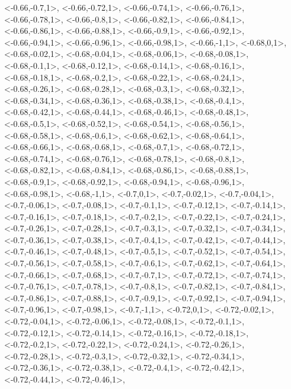 \documentclass[a4paper,10pt]{article}
\begin{document}
\begin{eulernotebook}
\begin{euleroutput}
  <-0.66,-0.7,1>,
  <-0.66,-0.72,1>,
  <-0.66,-0.74,1>,
  <-0.66,-0.76,1>,
  <-0.66,-0.78,1>,
  <-0.66,-0.8,1>,
  <-0.66,-0.82,1>,
  <-0.66,-0.84,1>,
  <-0.66,-0.86,1>,
  <-0.66,-0.88,1>,
  <-0.66,-0.9,1>,
  <-0.66,-0.92,1>,
  <-0.66,-0.94,1>,
  <-0.66,-0.96,1>,
  <-0.66,-0.98,1>,
  <-0.66,-1,1>,
  <-0.68,0,1>,
  <-0.68,-0.02,1>,
  <-0.68,-0.04,1>,
  <-0.68,-0.06,1>,
  <-0.68,-0.08,1>,
  <-0.68,-0.1,1>,
  <-0.68,-0.12,1>,
  <-0.68,-0.14,1>,
  <-0.68,-0.16,1>,
  <-0.68,-0.18,1>,
  <-0.68,-0.2,1>,
  <-0.68,-0.22,1>,
  <-0.68,-0.24,1>,
  <-0.68,-0.26,1>,
  <-0.68,-0.28,1>,
  <-0.68,-0.3,1>,
  <-0.68,-0.32,1>,
  <-0.68,-0.34,1>,
  <-0.68,-0.36,1>,
  <-0.68,-0.38,1>,
  <-0.68,-0.4,1>,
  <-0.68,-0.42,1>,
  <-0.68,-0.44,1>,
  <-0.68,-0.46,1>,
  <-0.68,-0.48,1>,
  <-0.68,-0.5,1>,
  <-0.68,-0.52,1>,
  <-0.68,-0.54,1>,
  <-0.68,-0.56,1>,
  <-0.68,-0.58,1>,
  <-0.68,-0.6,1>,
  <-0.68,-0.62,1>,
  <-0.68,-0.64,1>,
  <-0.68,-0.66,1>,
  <-0.68,-0.68,1>,
  <-0.68,-0.7,1>,
  <-0.68,-0.72,1>,
  <-0.68,-0.74,1>,
  <-0.68,-0.76,1>,
  <-0.68,-0.78,1>,
  <-0.68,-0.8,1>,
  <-0.68,-0.82,1>,
  <-0.68,-0.84,1>,
  <-0.68,-0.86,1>,
  <-0.68,-0.88,1>,
  <-0.68,-0.9,1>,
  <-0.68,-0.92,1>,
  <-0.68,-0.94,1>,
  <-0.68,-0.96,1>,
  <-0.68,-0.98,1>,
  <-0.68,-1,1>,
  <-0.7,0,1>,
  <-0.7,-0.02,1>,
  <-0.7,-0.04,1>,
  <-0.7,-0.06,1>,
  <-0.7,-0.08,1>,
  <-0.7,-0.1,1>,
  <-0.7,-0.12,1>,
  <-0.7,-0.14,1>,
  <-0.7,-0.16,1>,
  <-0.7,-0.18,1>,
  <-0.7,-0.2,1>,
  <-0.7,-0.22,1>,
  <-0.7,-0.24,1>,
  <-0.7,-0.26,1>,
  <-0.7,-0.28,1>,
  <-0.7,-0.3,1>,
  <-0.7,-0.32,1>,
  <-0.7,-0.34,1>,
  <-0.7,-0.36,1>,
  <-0.7,-0.38,1>,
  <-0.7,-0.4,1>,
  <-0.7,-0.42,1>,
  <-0.7,-0.44,1>,
  <-0.7,-0.46,1>,
  <-0.7,-0.48,1>,
  <-0.7,-0.5,1>,
  <-0.7,-0.52,1>,
  <-0.7,-0.54,1>,
  <-0.7,-0.56,1>,
  <-0.7,-0.58,1>,
  <-0.7,-0.6,1>,
  <-0.7,-0.62,1>,
  <-0.7,-0.64,1>,
  <-0.7,-0.66,1>,
  <-0.7,-0.68,1>,
  <-0.7,-0.7,1>,
  <-0.7,-0.72,1>,
  <-0.7,-0.74,1>,
  <-0.7,-0.76,1>,
  <-0.7,-0.78,1>,
  <-0.7,-0.8,1>,
  <-0.7,-0.82,1>,
  <-0.7,-0.84,1>,
  <-0.7,-0.86,1>,
  <-0.7,-0.88,1>,
  <-0.7,-0.9,1>,
  <-0.7,-0.92,1>,
  <-0.7,-0.94,1>,
  <-0.7,-0.96,1>,
  <-0.7,-0.98,1>,
  <-0.7,-1,1>,
  <-0.72,0,1>,
  <-0.72,-0.02,1>,
  <-0.72,-0.04,1>,
  <-0.72,-0.06,1>,
  <-0.72,-0.08,1>,
  <-0.72,-0.1,1>,
  <-0.72,-0.12,1>,
  <-0.72,-0.14,1>,
  <-0.72,-0.16,1>,
  <-0.72,-0.18,1>,
  <-0.72,-0.2,1>,
  <-0.72,-0.22,1>,
  <-0.72,-0.24,1>,
  <-0.72,-0.26,1>,
  <-0.72,-0.28,1>,
  <-0.72,-0.3,1>,
  <-0.72,-0.32,1>,
  <-0.72,-0.34,1>,
  <-0.72,-0.36,1>,
  <-0.72,-0.38,1>,
  <-0.72,-0.4,1>,
  <-0.72,-0.42,1>,
  <-0.72,-0.44,1>,
  <-0.72,-0.46,1>,

\end{euleroutput}
\end{eulernotebook}
\end{document}
